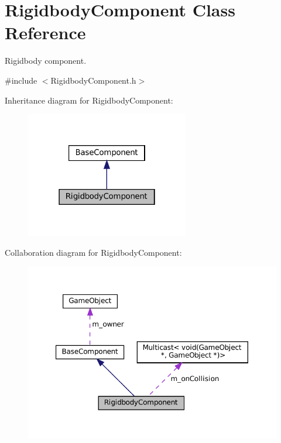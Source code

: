 \hypertarget{classRigidbodyComponent}{}\section{Rigidbody\+Component Class Reference}
\label{classRigidbodyComponent}


Rigidbody component.  




{\ttfamily \#include $<$Rigidbody\+Component.\+h$>$}



Inheritance diagram for Rigidbody\+Component\+:
\nopagebreak
\begin{figure}[H]
\begin{center}
\leavevmode
\includegraphics[width=202pt]{classRigidbodyComponent__inherit__graph}
\end{center}
\end{figure}


Collaboration diagram for Rigidbody\+Component\+:
\nopagebreak
\begin{figure}[H]
\begin{center}
\leavevmode
\includegraphics[width=350pt]{classRigidbodyComponent__coll__graph}
\end{center}
\end{figure}
